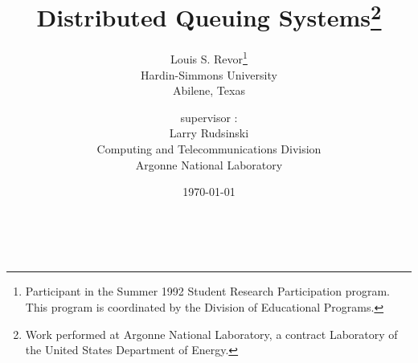 \def\achilles{Sun4/490}
\def\qsub{\mbox{\it qsub}\ }
\def\qstat{\mbox{\it qstat}\ }
\def\group{\mbox{\it group}\ }
\def\queue{\mbox{\it queue}\ }
\def\queues{\mbox{\it queues}\ }
\def\qmaster{\mbox{\it qmaster}\ }
\def\pvm{PVM}

\title{Distributed Queuing Systems\thanks{Work
performed at Argonne National Laboratory, a contract Laboratory of the
United States Department of Energy.}}
\author{Louis S. Revor\thanks{
     Participant in the Summer 1992 Student Research Participation
     program.
     This program is coordinated by the Division
     of Educational Programs.}\\
     Hardin-Simmons University\\
     Abilene, Texas\\
   \and
     supervisor :\\
     Larry Rudsinski\\
     Computing and Telecommunications Division\\
     Argonne National Laboratory}
\date{\today}
\maketitle
\newpage










